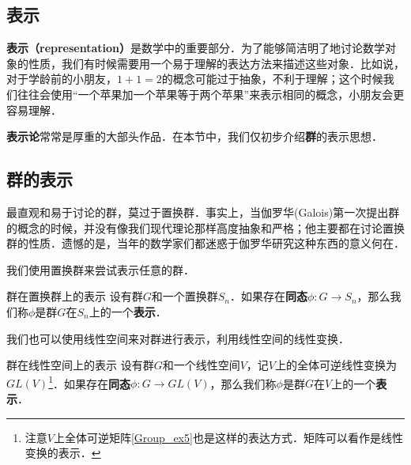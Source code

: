 \subsection{表示}

\textbf{表示（representation）}是数学中的重要部分．为了能够简洁明了地讨论数学对象的性质，我们有时候需要用一个易于理解的表达方法来描述这些对象．比如说，对于学龄前的小朋友，$1+1=2$的概念可能过于抽象，不利于理解；这个时候我们往往会使用“一个苹果加一个苹果等于两个苹果”来表示相同的概念，小朋友会更容易理解．

\textbf{表示论}常常是厚重的大部头作品．在本节中，我们仅初步介绍\textbf{群}的表示思想．

\subsection{群的表示}

最直观和易于讨论的群，莫过于置换群．事实上，当伽罗华(Galois)第一次提出群的概念的时候，并没有像我们现代理论那样高度抽象和严格；他主要都在讨论置换群的性质．遗憾的是，当年的数学家们都迷惑于伽罗华研究这种东西的意义何在．

我们使用置换群来尝试表示任意的群．

\begin{definition}{群在置换群上的表示}
设有群$G$和一个置换群$S_n$．如果存在\textbf{同态}$\phi: G\rightarrow S_n$，那么我们称$\phi$是群$G$在$S_n$上的一个\textbf{表示}．
\end{definition}

我们也可以使用线性空间来对群进行表示，利用线性空间的线性变换．

\begin{definition}{群在线性空间上的表示}
设有群$G$和一个线性空间$V$，记$V$上的全体可逆线性变换为$GL(V)$\footnote{注意$V$上全体可逆矩阵\autoref{Group_ex5}也是这样的表达方式．矩阵可以看作是线性变换的表示．}．如果存在\textbf{同态}$\phi: G\rightarrow GL(V)$，那么我们称$\phi$是群$G$在$V$上的一个\textbf{表示}．
\end{definition}